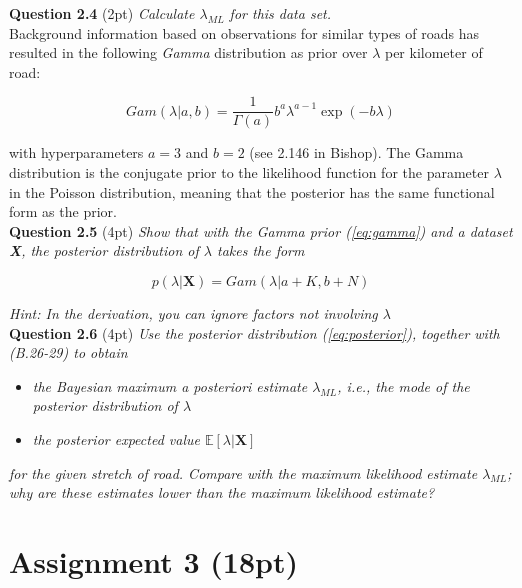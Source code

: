 \documentclass[a4paper]{article}
\begin{document}
\textbf{Question 2.4} (2pt) \textit{Calculate $\lambda_{ML}$ for this data set.}\\

Background information based on observations for similar types of roads has resulted in the following \textit{Gamma} distribution as prior over $\lambda$ per kilometer of road:

\begin{equation}
\label{eq:gamma}
 Gam(\lambda | a, b) = \frac{1}{\Gamma(a)} b^a \lambda^{a-1} \exp(-b \lambda)
\end{equation}

with hyperparameters $a = 3$ and $b = 2$ (see 2.146 in Bishop). The Gamma distribution is the conjugate prior to the likelihood function for the parameter $\lambda$ in the Poisson distribution, meaning
that the posterior has the same functional form as the prior.\\

\textbf{Question 2.5} (4pt) \textit{Show that with the Gamma prior (\ref{eq:gamma}) and a dataset \textbf{X}, the posterior distribution of $\lambda$ takes the form}

\begin{equation}
\label{eq:posterior}
p(\lambda | \textbf{X}) = Gam(\lambda | a + K, b + N)
\end{equation}

\textit{Hint: In the derivation, you can ignore factors not involving $\lambda$}\\

\textbf{Question 2.6} (4pt) \textit{Use the posterior distribution (\ref{eq:posterior}), together with (B.26-29) to obtain}

\begin{itemize}
	\item \textit{the Bayesian maximum a posteriori estimate $\lambda_{ML}$, i.e., the mode of the posterior distribution
of $\lambda$ }
	\item \textit{the posterior expected value $\mathbb{E}[\lambda | \textbf{X}]$}
\end{itemize}

\textit{for the given stretch of road. Compare with the maximum likelihood estimate $\lambda_{ML}$; why are these
estimates lower than the maximum likelihood estimate?}



\section*{Assignment 3 (18pt)}
\end{document}
